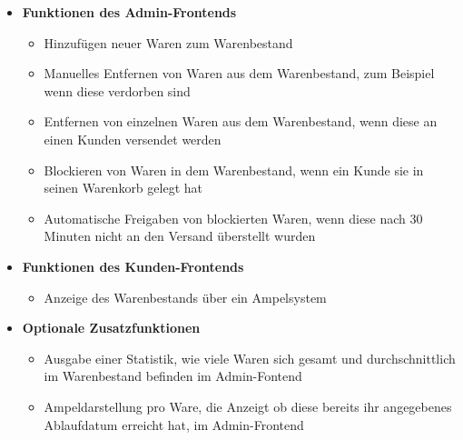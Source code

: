 \begin{itemize}
	\item \textbf{Funktionen des Admin-Frontends}
	\begin{itemize}
		\item Hinzufügen neuer Waren zum Warenbestand
		\item Manuelles Entfernen von Waren aus dem Warenbestand, zum Beispiel wenn diese verdorben sind
		\item Entfernen von einzelnen Waren aus dem Warenbestand, wenn diese an einen Kunden versendet werden
		\item Blockieren von Waren in dem Warenbestand, wenn ein Kunde sie in seinen Warenkorb gelegt hat
		\item Automatische Freigaben von blockierten Waren, wenn diese nach 30 Minuten nicht an den Versand überstellt wurden
	\end{itemize}
	\item \textbf{Funktionen des Kunden-Frontends}
	\begin{itemize}
		\item Anzeige des Warenbestands über ein Ampelsystem
	\end{itemize}
	\item \textbf{Optionale Zusatzfunktionen}
	\begin{itemize}
		\item Ausgabe einer Statistik, wie viele Waren sich gesamt und durchschnittlich im Warenbestand befinden im Admin-Fontend
		\item Ampeldarstellung pro Ware, die Anzeigt ob diese bereits ihr angegebenes Ablaufdatum erreicht hat, im Admin-Frontend
	\end{itemize}
\end{itemize}
